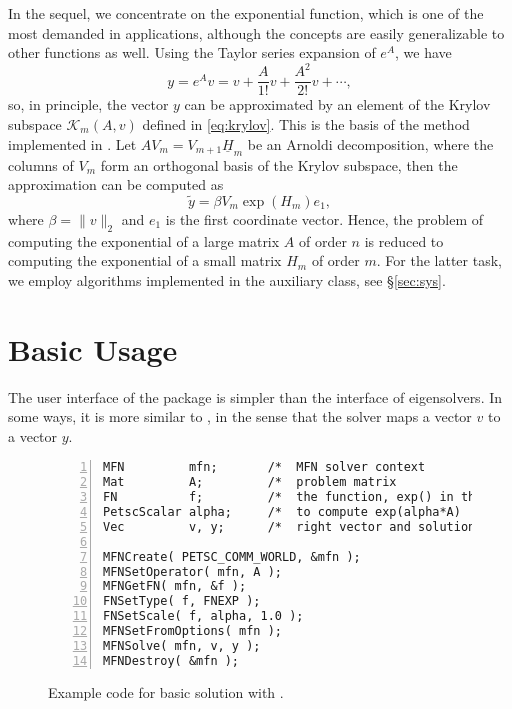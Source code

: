 In the sequel, we concentrate on the exponential function, which is one of the most demanded in applications, although the concepts are easily generalizable to other functions as well. Using the Taylor series expansion of $e^A$, we have
\begin{equation}
y=e^Av=v+\frac{A}{1!}v+\frac{A^2}{2!}v+\cdots,
\end{equation}
so, in principle, the vector $y$ can be approximated by an element of the Krylov subspace $\mathcal{K}_m(A,v)$ defined in \eqref{eq:krylov}. This is the basis of the method implemented in \expokit \citep{Sidje:1998:ESP}. Let $AV_m=V_{m+1}\underline{H}_m$ be an Arnoldi decomposition, where the columns of $V_m$ form an orthogonal basis of the Krylov subspace, then the approximation can be computed as
\begin{equation}
\tilde y=\beta V_m\exp(H_m)e_1,
\end{equation}
where $\beta=\|v\|_2$ and $e_1$ is the first coordinate vector. Hence, the problem of computing the exponential of a large matrix $A$ of order $n$ is reduced to computing the exponential of a small matrix $H_m$ of order $m$. For the latter task, we employ algorithms implemented in the  auxiliary class, see \S\ref{sec:sys}.

\section{Basic Usage}

The user interface of the  package is simpler than the interface of eigensolvers. In some ways, it is more similar to , in the sense that the solver maps a vector $v$ to a vector $y$.

\begin{figure}
\begin{Verbatim}[fontsize=\small,numbers=left,numbersep=6pt,xleftmargin=15mm]
MFN         mfn;       /*  MFN solver context                  */
Mat         A;         /*  problem matrix                      */
FN          f;         /*  the function, exp() in this example */
PetscScalar alpha;     /*  to compute exp(alpha*A)             */
Vec         v, y;      /*  right vector and solution           */

MFNCreate( PETSC_COMM_WORLD, &mfn );
MFNSetOperator( mfn, A );
MFNGetFN( mfn, &f );
FNSetType( f, FNEXP );
FNSetScale( f, alpha, 1.0 );
MFNSetFromOptions( mfn );
MFNSolve( mfn, v, y );
MFNDestroy( &mfn );
\end{Verbatim}
\caption{\label{fig:ex-mfn}Example code for basic solution with .}
\end{figure}

